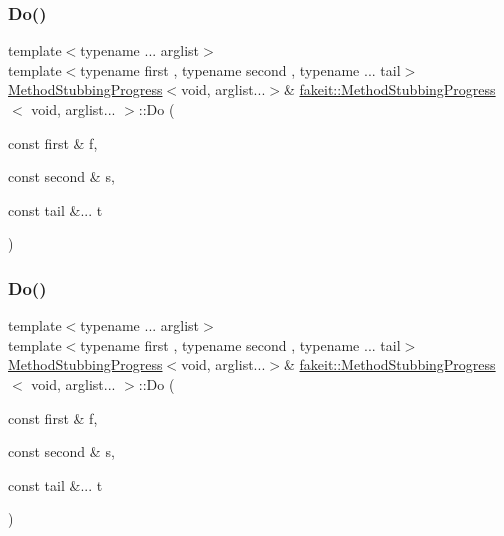 \mbox{\label{structfakeit_1_1MethodStubbingProgress_3_01void_00_01arglist_8_8_8_01_4_a45b048006587b626f8220aa4b196de2a}} 
\subsubsection{\texorpdfstring{Do()}{Do()}\hspace{0.1cm}{\footnotesize\ttfamily [14/27]}}
{\footnotesize\ttfamily template$<$typename ... arglist$>$ \\
template$<$typename first , typename second , typename ... tail$>$ \\
\mbox{\hyperlink{structfakeit_1_1MethodStubbingProgress}{Method\+Stubbing\+Progress}}$<$void, arglist...$>$\& \mbox{\hyperlink{structfakeit_1_1MethodStubbingProgress}{fakeit\+::\+Method\+Stubbing\+Progress}}$<$ void, arglist... $>$\+::Do (\begin{DoxyParamCaption}\item[{const first \&}]{f,  }\item[{const second \&}]{s,  }\item[{const tail \&...}]{t }\end{DoxyParamCaption})\hspace{0.3cm}{\ttfamily [inline]}}

\mbox{\label{structfakeit_1_1MethodStubbingProgress_3_01void_00_01arglist_8_8_8_01_4_a45b048006587b626f8220aa4b196de2a}} 
\subsubsection{\texorpdfstring{Do()}{Do()}\hspace{0.1cm}{\footnotesize\ttfamily [15/27]}}
{\footnotesize\ttfamily template$<$typename ... arglist$>$ \\
template$<$typename first , typename second , typename ... tail$>$ \\
\mbox{\hyperlink{structfakeit_1_1MethodStubbingProgress}{Method\+Stubbing\+Progress}}$<$void, arglist...$>$\& \mbox{\hyperlink{structfakeit_1_1MethodStubbingProgress}{fakeit\+::\+Method\+Stubbing\+Progress}}$<$ void, arglist... $>$\+::Do (\begin{DoxyParamCaption}\item[{const first \&}]{f,  }\item[{const second \&}]{s,  }\item[{const tail \&...}]{t }\end{DoxyParamCaption})\hspace{0.3cm}{\ttfamily [inline]}}

